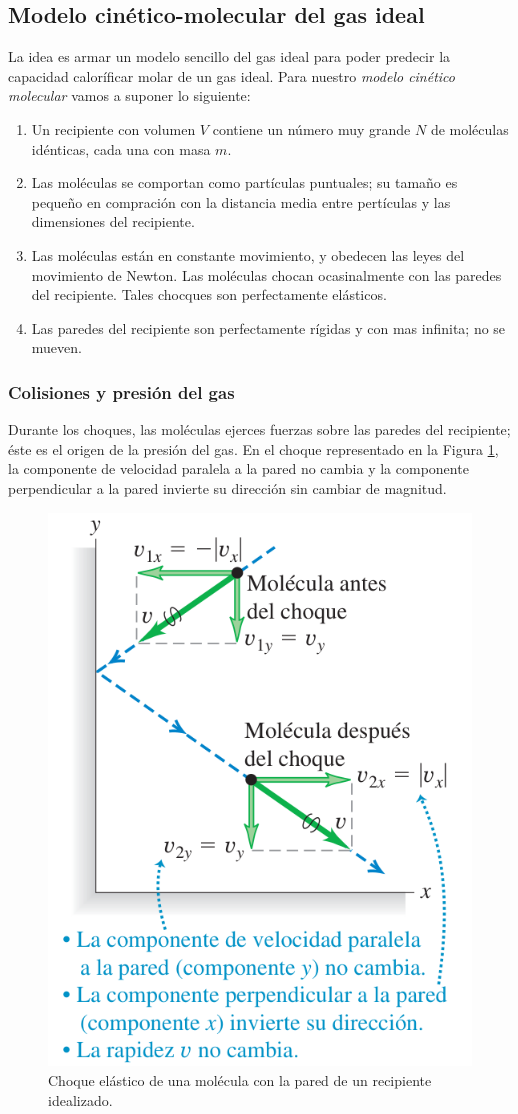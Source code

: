 \documentclass[12pt]{article}
\begin{document}
  \subsection{Modelo cinético-molecular del gas ideal}
  La idea es armar un modelo sencillo del gas ideal para poder predecir la capacidad caloríficar molar de un gas ideal.
  Para nuestro \textit{modelo cinético molecular} vamos a suponer lo siguiente:
  \begin{enumerate}[1.]
    \item Un recipiente con volumen $ V $ contiene un número muy grande $ N $ de moléculas idénticas, cada una con masa $ m $.

    \item Las moléculas se comportan como partículas puntuales; su tamaño es pequeño en compración con la distancia media entre pertículas y las dimensiones del recipiente.

    \item Las moléculas están en constante movimiento, y obedecen las leyes del movimiento de Newton. Las  moléculas chocan ocasinalmente con las paredes del recipiente. Tales chocques son perfectamente elásticos.

    \item Las paredes del recipiente son perfectamente rígidas y con mas infinita; no se mueven.
  \end{enumerate}

  \subsubsection{Colisiones y presión del gas}
  Durante los choques, las moléculas ejerces fuerzas sobre las paredes del recipiente; éste es el origen de la presión del gas. En el choque representado en la Figura \ref{fig:choque-gas}, la componente de velocidad paralela a la pared no cambia y la componente perpendicular a la pared invierte su dirección sin cambiar de magnitud.

  \begin{figure}[H]
    \centering
    \includegraphics[width=0.5\linewidth]{imagenes/choque-molecula-gas.png}
    \caption{Choque elástico de una molécula con la pared de un recipiente idealizado.}
    \label{fig:choque-gas}
  \end{figure}
  
\end{document}
